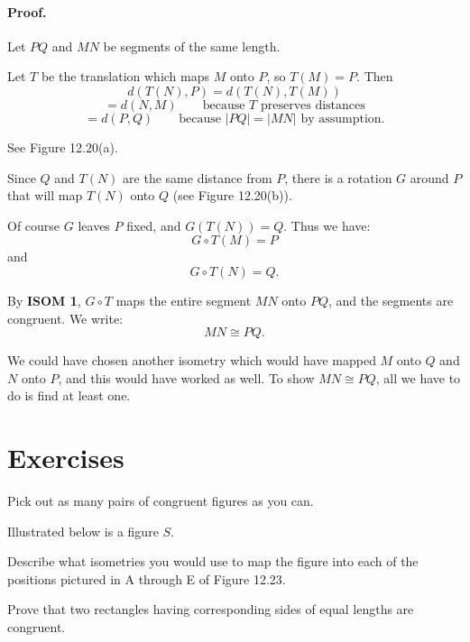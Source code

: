 \documentclass[12pt]{book} %
\begin{document}
\begin{ExerciseList}
\begin{ExerciseList}

\paragraph{Proof.}
Let $PQ$ and $MN$ be segments of the same length.


Let $T$ be the translation which maps $M$ onto $P$, so $T(M)=P$. Then
\[
d(T(N),P)=d(T(N),T(M))
\]
\[
=d(N,M)\qquad \text{because }T\text{ preserves distances}
\]
\[
=d(P,Q)\qquad \text{because }|PQ|=|MN| \text{ by assumption.}
\]

See Figure 12.20(a).


Since $Q$ and $T(N)$ are the same distance from $P$, there is a rotation $G$ around $P$ that will map $T(N)$ onto $Q$ (see Figure 12.20(b)).

Of course $G$ leaves $P$ fixed, and $G(T(N))=Q$. Thus we have:
\[
G\circ T(M)=P
\]
and
\[
G\circ T(N)=Q.
\]

By \textbf{ISOM 1}, $G\circ T$ maps the entire segment $MN$ onto $PQ$, and the segments are congruent. We write:
\[
MN\cong PQ.
\]

We could have chosen another isometry which would have mapped $M$ onto $Q$ and $N$ onto $P$, and this would have worked as well. To show $MN\cong PQ$, all we have to do is find at least one.

\section*{Exercises}

\setcounter{Exercise}{0}
\begin{ExerciseList}
\Exercise Pick out as many pairs of congruent figures as you can.


\Exercise Illustrated below is a figure $S$.


Describe what isometries you would use to map the figure into each of the positions pictured in A through E of Figure 12.23.


\Exercise Prove that two rectangles having corresponding sides of equal lengths are congruent.


\end{ExerciseList}
\end{ExerciseList}
\end{ExerciseList}
\end{document}
